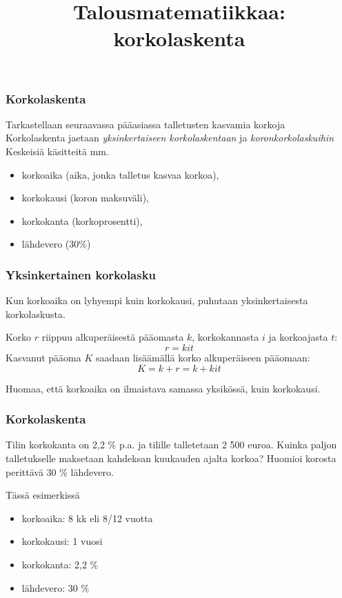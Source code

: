 \documentclass{beamer}
\title{Talousmatematiikkaa: korkolaskenta}
\newcommand{\pblock}{\\ \vspace{0.5cm}\pause}
\begin{document}
\begin{frame}
\maketitle
\end{frame}
\begin{frame}
    \frametitle{Korkolaskenta}
    Tarkastellaan seuraavassa pääasiassa talletusten kasvamia korkoja
    \pblock
    Korkolaskenta jaetaan \emph{yksinkertaiseen korkolaskentaan} ja \emph{koronkorkolaskuihin}
    \pblock
    Keskeisiä käsitteitä mm.
    \begin{itemize}
        \item korkoaika (aika, jonka talletus kasvaa korkoa),
        \item korkokausi (koron maksuväli),
        \item korkokanta (korkoprosentti),
        \item lähdevero (30\%)
    \end{itemize}
\end{frame}

\begin{frame}
    \frametitle{Yksinkertainen korkolasku}
    Kun korkoaika on lyhyempi kuin korkokausi, puhutaan yksinkertaisesta korkolaskusta.
    \pause
    \begin{block}{}
        Korko \(r\) riippuu alkuperäisestä pääomasta \(k\), korkokannasta \(i\) ja korkoajasta \(t\):\pause
        \[
        r = kit
        \]\pause
        Kasvanut pääoma \(K\) saadaan lisäämällä korko alkuperäiseen pääomaan:\pause
        \[
        K = k + r = k + kit
        \]
    \end{block}
    Huomaa, että korkoaika on ilmaistava samassa yksikössä, kuin korkokausi.
\end{frame}

\begin{frame}
    \frametitle{Korkolaskenta}
    \begin{esim}
        Tilin korkokanta on 2,2 \% p.a. ja tilille talletetaan 2 500 euroa.
        Kuinka paljon talletukselle maksetaan kahdeksan kuukauden ajalta korkoa? Huomioi korosta perittävä 30 \% lähdevero.
    \end{esim}
    \pause
    Tässä esimerkissä
    \begin{itemize}
        \item korkoaika: 8 kk eli 8/12 vuotta
        \item korkokausi: 1 vuosi
        \item korkokanta: 2,2 \%
        \item lähdevero: 30 \%
    \end{itemize}
\end{frame}
\end{document}
